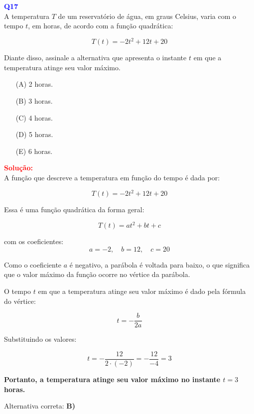 \documentclass[a4paper,12pt]{article}
\begin{document}
\begin{flushleft}
\textbf{\textcolor{blue}{\Large Q17}}\\
A temperatura \( T \) de um reservatório de água, em graus Celsius, varia com o tempo \( t \), em horas, de acordo com a função quadrática:

\[
T(t) = -2t^2 + 12t + 20
\]

Diante disso, assinale a alternativa que apresenta o instante \( t \) em que a temperatura atinge seu valor máximo.
\begin{itemize}
\item[(A)] 2 horas.
\item[(B)] 3 horas.
\item[(C)] 4 horas.
\item[(D)] 5 horas.
\item[(E)] 6 horas.
\end{itemize}

\vspace{0.5cm}

\textcolor{red}{\textbf{Solução:}}\\

A função que descreve a temperatura em função do tempo é dada por:

\[
T(t) = -2t^2 + 12t + 20
\]

Essa é uma função quadrática da forma geral:

\[
T(t) = at^2 + bt + c
\]

com os coeficientes:
\[
a = -2, \quad b = 12, \quad c = 20
\]

Como o coeficiente \( a \) é negativo, a parábola é voltada para baixo, o que significa que o valor máximo da função ocorre no vértice da parábola.

O tempo \( t \) em que a temperatura atinge seu valor máximo é dado pela fórmula do vértice:

\[
t = -\frac{b}{2a}
\]

Substituindo os valores:

\[
t = -\frac{12}{2 \cdot (-2)} = -\frac{12}{-4} = 3
\]

\textbf{Portanto, a temperatura atinge seu valor máximo no instante \( t = 3 \) horas.}

Alternativa correta: \colorbox{green!50}{\textbf{B)}}

\end{flushleft}
\end{document}
